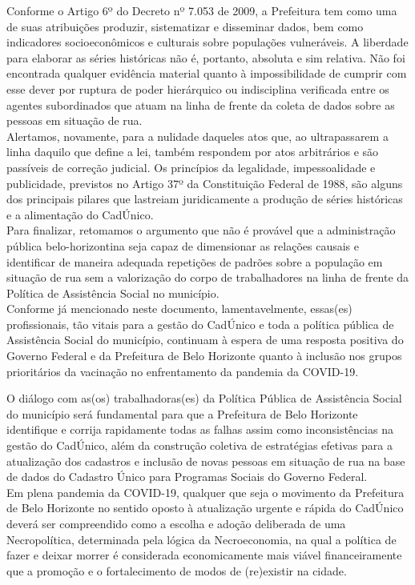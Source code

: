 \documentclass[12pt]{article}
\begin{document}
Conforme o Artigo 6º do Decreto nº 7.053 de 2009, a Prefeitura tem como uma de suas atribuições produzir, sistematizar e disseminar dados, bem como indicadores socioeconômicos e culturais sobre populações vulneráveis. A liberdade para elaborar as séries históricas não é, portanto, absoluta e sim relativa. Não foi encontrada qualquer evidência material quanto à impossibilidade de cumprir com esse dever por ruptura de poder hierárquico ou indisciplina verificada entre os agentes subordinados que atuam na linha de frente da coleta de dados sobre as pessoas em situação de rua.\\ 

Alertamos, novamente, para a nulidade daqueles atos que, ao ultrapassarem a linha daquilo que define a lei, também respondem por atos arbitrários e são passíveis de correção judicial. Os princípios da legalidade, impessoalidade e publicidade, previstos no Artigo 37º da Constituição Federal de 1988, são alguns dos principais pilares que lastreiam juridicamente a produção de séries históricas e a alimentação do CadÚnico.\\

Para finalizar, retomamos o argumento que não é provável que a administração pública belo-horizontina seja capaz de dimensionar as relações causais e identificar de maneira adequada repetições de padrões sobre a população em situação de rua sem a valorização do corpo de trabalhadores na linha de frente da Política de Assistência Social no município.\\

Conforme já mencionado neste documento, lamentavelmente, essas(es) profissionais, tão vitais para a gestão do CadÚnico e toda a política pública de Assistência Social do município, continuam à espera de uma resposta positiva do Governo Federal e da Prefeitura de Belo Horizonte quanto à inclusão nos grupos prioritários da vacinação no enfrentamento da pandemia da COVID-19.

O diálogo com as(os) trabalhadoras(es) da Política Pública de Assistência Social do município será fundamental para que a Prefeitura de Belo Horizonte identifique e corrija rapidamente todas as falhas assim como inconsistências na gestão do CadÚnico, além da construção coletiva de estratégias efetivas para a atualização dos cadastros e inclusão de novas pessoas em situação de rua na base de dados do Cadastro Único para Programas Sociais do Governo Federal.\\ 

Em plena pandemia da COVID-19, qualquer que seja o movimento da Prefeitura de Belo Horizonte no sentido oposto à atualização urgente e rápida do CadÚnico deverá ser compreendido como a escolha e adoção deliberada de uma Necropolítica, determinada pela lógica da Necroeconomia, na qual a política de fazer e deixar morrer é considerada economicamente mais viável financeiramente que a promoção e o fortalecimento de modos de (re)existir na cidade.\\

%



%
\end{document}
